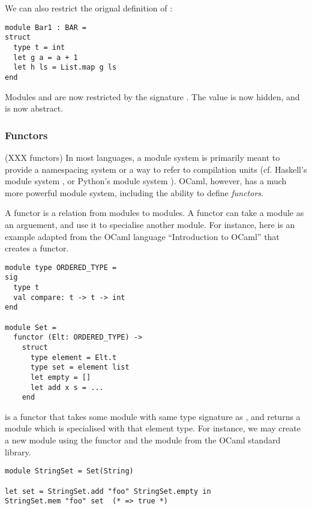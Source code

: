 We can also restrict the orignal definition of :

\begin{lstlisting}
module Bar1 : BAR =
struct
  type t = int
  let g a = a + 1
  let h ls = List.map g ls
end
\end{lstlisting}

Modules  and  are now restricted by the
signature . The value  is now hidden, and
 is now abstract.

\subsubsection{Functors}

(XXX functors) In most languages, a module system is primarily meant
to provide a namespacing system or a way to refer to compilation units
(cf. Haskell's module system \cite{www:haskell:modules}, or Python's
module system \cite{www:python:modules}). OCaml, however, has a much
more powerful module system, including the ability to define
\textit{functors}.

A functor is a relation from modules to modules. A functor can take a
module as an arguement, and use it to specialise another module. For
instance, here is an example adapted from the OCaml language
``Introduction to OCaml'' \cite{ocaml:spec} that creates a 
functor.

\begin{lstlisting}
module type ORDERED_TYPE =
sig
  type t
  val compare: t -> t -> int
end

module Set =
  functor (Elt: ORDERED_TYPE) ->
    struct
      type element = Elt.t
      type set = element list
      let empty = []
      let add x s = ...
    end
\end{lstlisting}

 is a functor that takes some module with same type
signature as , and returns a module which is
specialised with that element type. For instance, we may create a new
 module using the  functor and the
 module from the OCaml standard library.

\begin{lstlisting}
module StringSet = Set(String)

let set = StringSet.add "foo" StringSet.empty in
StringSet.mem "foo" set  (* => true *)
\end{lstlisting}

